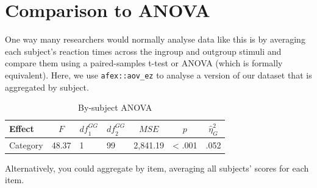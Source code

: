 \documentclass[doc,floatsintext]{apa6}
\newenvironment{Shaded}{\begin{snugshade}}{\end{snugshade}}
\newcommand{\KeywordTok}[1]{\textcolor[rgb]{0.13,0.29,0.53}{\textbf{#1}}}
\newcommand{\DataTypeTok}[1]{\textcolor[rgb]{0.13,0.29,0.53}{#1}}
\newcommand{\StringTok}[1]{\textcolor[rgb]{0.31,0.60,0.02}{#1}}
\newcommand{\CommentTok}[1]{\textcolor[rgb]{0.56,0.35,0.01}{\textit{#1}}}
\newcommand{\OperatorTok}[1]{\textcolor[rgb]{0.81,0.36,0.00}{\textbf{#1}}}
\newcommand{\NormalTok}[1]{#1}
\begin{document}
\section{Comparison to ANOVA}\label{comparison-to-anova}

One way many researchers would normally analyse data like this is by
averaging each subject's reaction times across the ingroup and outgroup
stimuli and compare them using a paired-samples t-test or ANOVA (which
is formally equivalent). Here, we use \texttt{afex::aov\_ez} to analyse
a version of our dataset that is aggregated by subject.

\begin{Shaded}
\end{Shaded}

\begin{table}[H]
\begin{center}
\begin{threeparttable}
\caption{\label{tab:by-subject-anova}By-subject ANOVA}
\begin{tabular}{lllllll}
\toprule
Effect & \multicolumn{1}{c}{$F$} & \multicolumn{1}{c}{$\mathit{df}_1^{GG}$} & \multicolumn{1}{c}{$\mathit{df}_2^{GG}$} & \multicolumn{1}{c}{$\mathit{MSE}$} & \multicolumn{1}{c}{$p$} & \multicolumn{1}{c}{$\hat{\eta}^2_G$}\\
\midrule
Category & 48.37 & 1 & 99 & 2,841.19 & < .001 & .052\\
\bottomrule
\end{tabular}
\end{threeparttable}
\end{center}
\end{table}

Alternatively, you could aggregate by item, averaging all subjects'
scores for each item.
\end{document}
